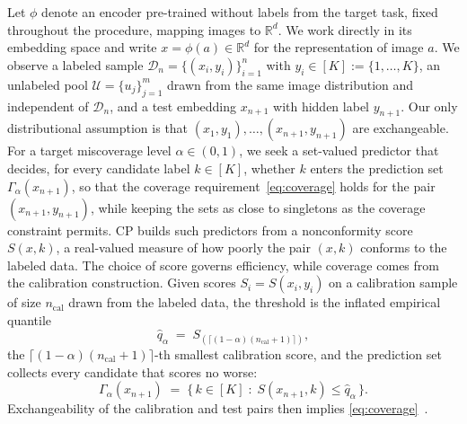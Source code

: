 Let $\phi$ denote an encoder pre-trained without labels from the target task, fixed throughout the procedure, mapping images to $\mathbb{R}^d$. We work directly in its
embedding space and write $x = \phi(a) \in \mathbb{R}^d$ for the
representation of image $a$. We observe a labeled sample
$\mathcal{D}_n = \{(x_i, y_i)\}_{i=1}^{n}$ with $y_i \in [K] :=
\{1, \dots, K\}$, an unlabeled pool $\mathcal{U} = \{u_j\}_{j=1}^{m}$
drawn from the same image distribution and independent of
$\mathcal{D}_n$, and a test embedding $x_{n+1}$ with hidden label
$y_{n+1}$. Our only distributional assumption is that
$(x_1, y_1), \dots, (x_{n+1}, y_{n+1})$ are exchangeable. For a target
miscoverage level $\alpha \in (0,1)$, we seek a set-valued predictor
that decides, for every candidate label $k \in [K]$, whether $k$ enters
the prediction set $\Gamma_\alpha(x_{n+1})$, so that the coverage
requirement~\eqref{eq:coverage} holds for the pair
$(x_{n+1}, y_{n+1})$, while keeping the sets as close to singletons as
the coverage constraint permits.
CP builds such predictors from a nonconformity score $S(x, k)$, a
real-valued measure of how poorly the pair $(x, k)$ conforms to the
labeled data. The choice of score governs efficiency, while coverage
comes from the calibration construction. Given scores
$S_i = S(x_i, y_i)$ on a calibration sample of size $n_{\mathrm{cal}}$
drawn from the labeled data, the threshold is the inflated empirical
quantile
\begin{equation}
\label{eq:quantile}
\hat q_\alpha \;=\; S_{(\lceil (1-\alpha)(n_{\mathrm{cal}}+1) \rceil)} ,
\end{equation}
the $\lceil (1-\alpha)(n_{\mathrm{cal}}+1) \rceil$-th smallest
calibration score, and the prediction set collects every candidate that
scores no worse:
\begin{equation}
\label{eq:set}
\Gamma_\alpha(x_{n+1}) \;=\;
\bigl\{\, k \in [K] \;:\; S(x_{n+1}, k) \le \hat q_\alpha \,\bigr\} .
\end{equation}
Exchangeability of the calibration and test pairs then implies
\eqref{eq:coverage}~\citep{vovk2005algorithmic,
papadopoulos2002inductive}.

